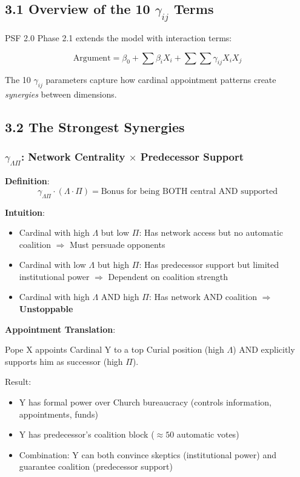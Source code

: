 \documentclass[11pt]{article}
\begin{document}
\subsection{3.1 Overview of the 10 $\gamma_{ij}$ Terms}

PSF 2.0 Phase 2.1 extends the model with interaction terms:

\begin{equation}
\text{Argument} = \beta_0 + \sum \beta_i X_i + \sum \sum \gamma_{ij} X_i X_j
\end{equation}

The 10 $\gamma_{ij}$ parameters capture how cardinal appointment patterns create \textit{synergies} between dimensions.

\subsection{3.2 The Strongest Synergies}

\subsubsection{$\gamma_{\Lambda\Pi}$: Network Centrality $\times$ Predecessor Support}

\textbf{Definition}:
$$\gamma_{\Lambda\Pi} \cdot (\Lambda \cdot \Pi) = \text{Bonus for being BOTH central AND supported}$$

\textbf{Intuition}:

\begin{itemize}
\item Cardinal with high $\Lambda$ but low $\Pi$: Has network access but no automatic coalition $\Rightarrow$ Must persuade opponents
\item Cardinal with low $\Lambda$ but high $\Pi$: Has predecessor support but limited institutional power $\Rightarrow$ Dependent on coalition strength
\item Cardinal with high $\Lambda$ AND high $\Pi$: Has network AND coalition $\Rightarrow$ \textbf{Unstoppable}
\end{itemize}

\textbf{Appointment Translation}:

Pope X appoints Cardinal Y to a top Curial position (high $\Lambda$) AND explicitly supports him as successor (high $\Pi$).

Result:
\begin{itemize}
\item Y has formal power over Church bureaucracy (controls information, appointments, funds)
\item Y has predecessor's coalition block ($\approx 50$ automatic votes)
\item Combination: Y can both convince skeptics (institutional power) and guarantee coalition (predecessor support)
\end{itemize}
\end{document}
